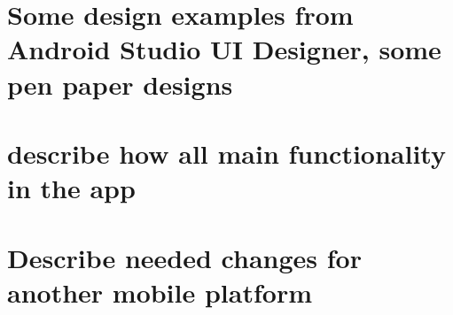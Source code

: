 \documentclass[a4paper,11pt,twoside]{article}
\begin{document}
\section{Some design examples from Android Studio UI Designer, some pen paper designs}

\section{describe how all main functionality in the app}


\section{Describe needed changes for another mobile platform}



\end{document}
